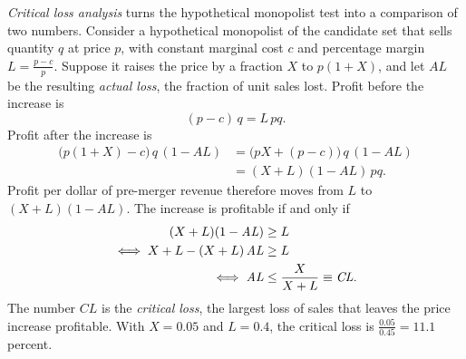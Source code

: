 \emph{Critical loss analysis} turns the hypothetical monopolist test into a comparison of two numbers. Consider a
hypothetical monopolist of the candidate set that sells quantity $q$ at price $p$, with constant marginal cost
$c$ and percentage margin $L = \frac{p - c}{p}$. Suppose it raises the price by a fraction $X$ to $p(1 + X)$, and
let $\mathit{AL}$ be the resulting \emph{actual loss}, the fraction of unit sales lost. Profit before the increase is
\begin{equation*}
(p - c)\,q = L\,pq.
\end{equation*}
Profit after the increase is
\begin{align*}
\big(p(1 + X) - c\big)\,q\,(1 - \mathit{AL})
&= \big(pX + (p - c)\big)\,q\,(1 - \mathit{AL}) \\
&= (X + L)(1 - \mathit{AL})\,pq.
\end{align*}
Profit per dollar of pre-merger revenue therefore moves from $L$ to $(X + L)(1 - \mathit{AL})$. The increase is
profitable if and only if
\begin{align}
(X + L)(1 - \mathit{AL}) &\ge L \notag \\
\iff X + L - (X + L)\,\mathit{AL} &\ge L \notag \\
\iff \mathit{AL} &\le \frac{X}{X + L} \equiv \mathit{CL}. \label{eq:11-cl}
\end{align}
The number $\mathit{CL}$ is the \emph{critical loss}, the largest loss of sales that leaves the price increase
profitable. With $X = 0.05$ and $L = 0.4$, the critical loss is $\frac{0.05}{0.45} = 11.1$ percent.


